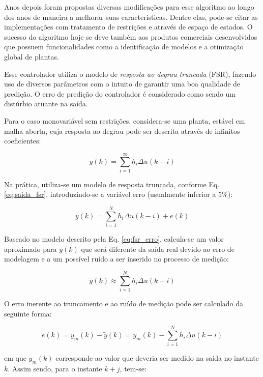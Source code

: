 Anos depois foram propostas diversas modificações para esse algoritmo ao longo
dos anos de maneira a melhorar suas características. Dentre elas, pode-se citar
as implementações com tratamento de restrições e através de espaço de estados.
O sucesso do algoritmo hoje se deve também aos produtos comerciais desenvolvidos
que possuem funcionalidades como a identificação de modelos e a otimização
global de plantas.

Esse controlador utiliza o modelo de {\it resposta ao degrau truncada} (FSR),
fazendo uso de diversos parâmetros com o intuito de garantir uma boa qualidade
de predição. O erro de predição do controlador é considerado como sendo um
distúrbio atuante na saída.

Para o caso monovariável sem restrições, considera-se uma planta, estável em
malha aberta, cuja resposta ao degrau pode ser descrita através de infinitos
coeficientes:

\begin{equation}\label{eq:fsr_inf}
y(k) = \sum_{i=1}^\infty h_i\Delta u(k-i)
\end{equation}

Na prática, utiliza-se um modelo de resposta truncada, conforme Eq.
\ref{eq:saida_fsr}, introduzindo-se a variável erro (usualmente inferior a 5\%):

\begin{equation}\label{eq:fsr_erro}
y(k) = \sum_{i=1}^N h_i\Delta u(k-i) + e(k)
\end{equation}

Baseado no modelo descrito pela Eq. \ref{eq:fsr_erro}, calcula-se um valor
aproximado para $y(k)$ que será diferente da saída real devido ao erro de
modelagem e a um possível ruído a ser inserido no processo de medição: 

\begin{equation}\label{eq:y_til}
\tilde{y}(k) \approx \sum_{i=1}^N h_i\Delta u(k-i)
\end{equation}

O erro inerente ao truncamento e ao ruído de medição pode ser calculado da
seguinte forma:

\begin{equation}\label{eq:erro}
e(k) = y_m(k) - \tilde{y}(k) = y_m(k) - \sum_{i=1}^N h_i\Delta u(k-i)
\end{equation}

\noindent em que $y_m(k)$ corresponde ao valor que deveria ser medido na saída
no instante $k$. Assim sendo, para o instante $k+j$, tem-se:

